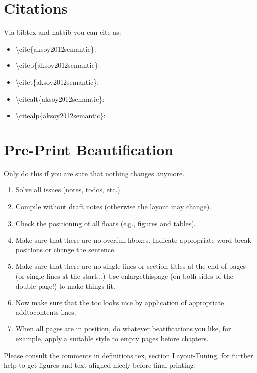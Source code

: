 \section{Citations}
\label{sec:citations}

Via bibtex and natbib you can cite as:

\begin{itemize}
  \item \textbackslash cite\{aksoy2012semantic\}: \cite{aksoy2012semantic}
  \item \textbackslash citep\{aksoy2012semantic\}: \citet{aksoy2012semantic}
  \item \textbackslash citet\{aksoy2012semantic\}: \citep{aksoy2012semantic}
  \item \textbackslash citealt\{aksoy2012semantic\}: \citealt{aksoy2012semantic}
  \item \textbackslash citealp\{aksoy2012semantic\}: \citealp{aksoy2012semantic}
\end{itemize}


\section{Pre-Print Beautification}
\label{sec:pre-print-beaut}

Only do this if you are sure that nothing changes anymore.

\begin{enumerate}
\item Solve all issues (notes, todos, etc.)
\item Compile without draft notes (otherwise the layout may change).
\item Check the positioning of all floats (e.g., figures and tables).
\item Make sure that there are no overfull hboxes. Indicate appropriate word-break positions or change the sentence.
\item Make sure that there are no single lines or section titles at the end of pages (or single lines at the start...) Use enlargethispage (on both sides of the double page!) to make things fit.
\item Now make sure that the toc looks nice by application of appropriate addtocontents lines.
\item When all pages are in position, do whatever beatifications you like, for example, apply a suitable style to empty pages before chapters.
\end{enumerate}

Please consult the comments in definitions.tex, section Layout-Tuning, for further help to get figures and text aligned nicely before final printing.

\enlargethispage{4\baselineskip}


